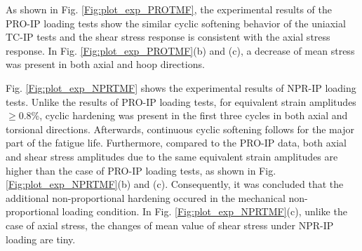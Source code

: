\documentclass[preprint,5p,twocolumn,11pt,sort&compress]{elsarticle}
\begin{document}
As shown in Fig. \ref{Fig:plot_exp_PROTMF}, the experimental results of the PRO-IP loading tests show the similar cyclic softening behavior of the uniaxial TC-IP tests and the shear stress response is consistent with the axial stress response. In Fig. \ref{Fig:plot_exp_PROTMF}(b) and (c), a decrease of mean stress was present in both axial and hoop directions.


Fig. \ref{Fig:plot_exp_NPRTMF} shows the experimental results of NPR-IP loading tests. Unlike the results of PRO-IP loading tests, for equivalent strain amplitudes $\geqslant$0.8\%, cyclic hardening was present in the first three cycles in both axial and torsional directions. Afterwards, continuous cyclic softening follows for the major part of the fatigue life. Furthermore, compared to the PRO-IP data, both axial and shear stress amplitudes due to the same equivalent strain amplitudes are higher than the case of PRO-IP loading tests, as shown in Fig. \ref{Fig:plot_exp_NPRTMF}(b) and (c). Consequently, it was concluded that the additional non-proportional hardening occured in the mechanical non-proportional loading condition. In Fig. \ref{Fig:plot_exp_NPRTMF}(c), unlike the case of axial stress, the changes of mean value of shear stress under NPR-IP loading are tiny.




\end{document}

